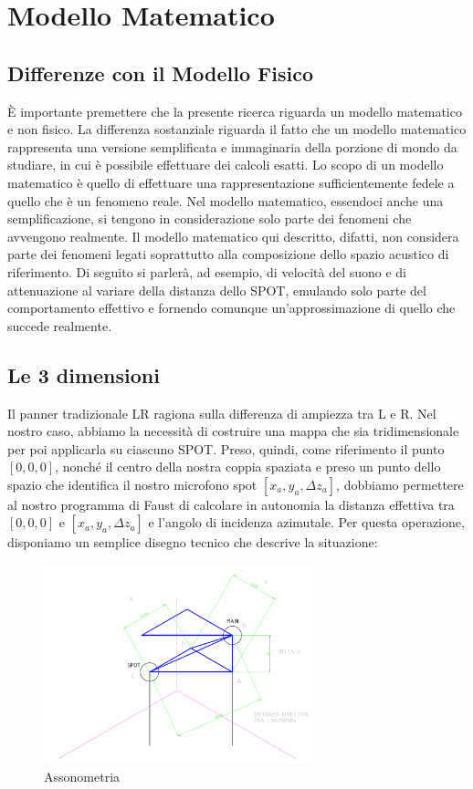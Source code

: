 \documentclass{article}
\begin{document}
\section{Modello Matematico}

    \subsection{Differenze con il Modello Fisico}
    È importante premettere che la presente ricerca riguarda un modello matematico e non fisico. La differenza sostanziale riguarda il fatto che un modello matematico rappresenta una versione semplificata e immaginaria della porzione di mondo da studiare, in cui è possibile effettuare dei calcoli esatti. Lo scopo di un modello matematico è quello di effettuare una rappresentazione sufficientemente fedele a quello che è un fenomeno reale. Nel modello matematico, essendoci anche una semplificazione, si tengono in considerazione solo parte dei fenomeni che avvengono realmente. Il modello matematico qui descritto, difatti, non considera parte dei fenomeni legati soprattutto alla composizione dello spazio acustico di riferimento. Di seguito si parlerà, ad esempio, di velocità del suono e di attenuazione al variare della distanza dello SPOT, emulando solo parte del comportamento effettivo e fornendo comunque un'approssimazione di quello che succede realmente.
    \subsection{Le 3 dimensioni}
    Il panner tradizionale LR ragiona sulla differenza di ampiezza tra L e R. Nel nostro caso, abbiamo la necessità di costruire una mappa che sia tridimensionale per poi applicarla su ciascuno SPOT. Preso, quindi, come riferimento il punto $\left[0,0,0\right]$, nonché il centro della nostra coppia spaziata e preso un punto dello spazio che identifica il nostro microfono spot $\left[x_a,y_a,\Delta z_a\right]$, dobbiamo permettere al nostro programma di Faust di calcolare in autonomia la distanza effettiva tra $\left[0,0,0\right]$ e $\left[x_a,y_a,\Delta z_a\right]$ e l'angolo di incidenza azimutale. Per questa operazione, disponiamo un semplice disegno tecnico che descrive la situazione:

    \begin{figure}[H]
        \centering
        \includegraphics[width=0.7\textwidth]{images/Assonometria.png}
         \caption{\label{fig1}Assonometria}
    \end{figure}
\end{document}
